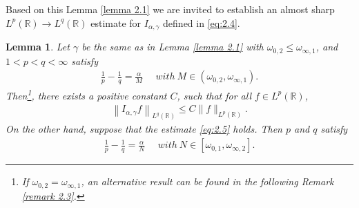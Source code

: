 \documentclass[11pt, twoside, leqno]{article}
\newtheorem{lemma}[theorem]{Lemma}
\theoremstyle{definition}
\numberwithin{equation}{section}
\begin{document}
Based on this Lemma \ref{lemma 2.1} we are invited to establish an almost sharp $L^p(\mathbb{R})\rightarrow L^q(\mathbb{R})$ estimate for $I_{\alpha,\gamma}$ defined in \eqref{eq:2.4}.

\begin{lemma}\label{lemma 2.2}
Let $\gamma $ be the same as in Lemma \ref{lemma 2.1} with $\omega_{0,2}\leq\omega_{\infty,1}$, and $1<p<q<\infty$ satisfy
\begin{align*}
\frac{1}{p}-\frac{1}{q}=\frac{\alpha}{M} ~~~~~~with~ M\in (\omega_{0,2}, \omega_{\infty,1}).
\end{align*}
Then\footnote{If $\omega_{0,2}=\omega_{\infty,1}$, an alternative result can be found in the following Remark \ref{remark 2.3}.}, there exists a positive constant $C$, such that for all $f\in L^p(\mathbb{R})$,
\begin{align}\label{eq:2.5}
\left\|I_{\alpha,\gamma}f\right\|_{L^{q}(\mathbb{R})} \leq C \|f\|_{L^{p}(\mathbb{R})}.
\end{align}
On the other hand, suppose that the estimate \eqref{eq:2.5} holds. Then $p$ and $q$ satisfy
\begin{align*}
\frac{1}{p}-\frac{1}{q}=\frac{\alpha}{N}~~~~~~with~N\in [\omega_{0,1}, \omega_{\infty,2}].
\end{align*}
\end{lemma}
\end{document}
